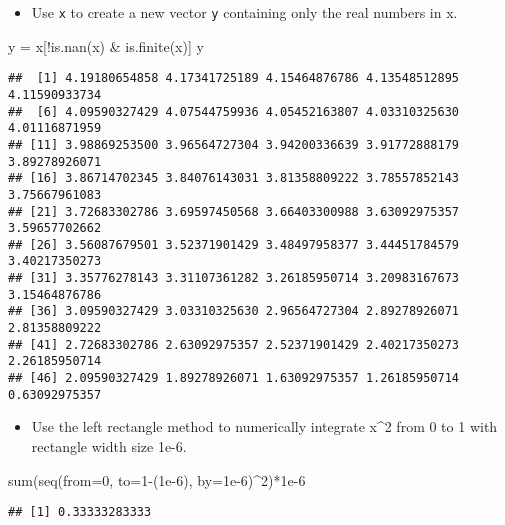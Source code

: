 \documentclass[
]{article}
\newenvironment{Shaded}{\begin{snugshade}}{\end{snugshade}}
\newcommand{\AttributeTok}[1]{\textcolor[rgb]{0.77,0.63,0.00}{#1}}
\newcommand{\DecValTok}[1]{\textcolor[rgb]{0.00,0.00,0.81}{#1}}
\newcommand{\FloatTok}[1]{\textcolor[rgb]{0.00,0.00,0.81}{#1}}
\newcommand{\FunctionTok}[1]{\textcolor[rgb]{0.00,0.00,0.00}{#1}}
\newcommand{\NormalTok}[1]{#1}
\newcommand{\OtherTok}[1]{\textcolor[rgb]{0.56,0.35,0.01}{#1}}
\newcommand{\SpecialCharTok}[1]{\textcolor[rgb]{0.00,0.00,0.00}{#1}}
\providecommand{\tightlist}{%
  \setlength{\itemsep}{0pt}\setlength{\parskip}{0pt}}
\begin{document}
\begin{itemize}
\tightlist
\item
  Use \texttt{x} to create a new vector \texttt{y} containing only the
  real numbers in x.
\end{itemize}

\begin{Shaded}
\begin{Highlighting}[]
\NormalTok{y }\OtherTok{=}\NormalTok{ x[}\SpecialCharTok{!}\FunctionTok{is.nan}\NormalTok{(x) }\SpecialCharTok{\&} \FunctionTok{is.finite}\NormalTok{(x)]}
\NormalTok{y}
\end{Highlighting}
\end{Shaded}

\begin{verbatim}
##  [1] 4.19180654858 4.17341725189 4.15464876786 4.13548512895 4.11590933734
##  [6] 4.09590327429 4.07544759936 4.05452163807 4.03310325630 4.01116871959
## [11] 3.98869253500 3.96564727304 3.94200336639 3.91772888179 3.89278926071
## [16] 3.86714702345 3.84076143031 3.81358809222 3.78557852143 3.75667961083
## [21] 3.72683302786 3.69597450568 3.66403300988 3.63092975357 3.59657702662
## [26] 3.56087679501 3.52371901429 3.48497958377 3.44451784579 3.40217350273
## [31] 3.35776278143 3.31107361282 3.26185950714 3.20983167673 3.15464876786
## [36] 3.09590327429 3.03310325630 2.96564727304 2.89278926071 2.81358809222
## [41] 2.72683302786 2.63092975357 2.52371901429 2.40217350273 2.26185950714
## [46] 2.09590327429 1.89278926071 1.63092975357 1.26185950714 0.63092975357
\end{verbatim}

\begin{itemize}
\tightlist
\item
  Use the left rectangle method to numerically integrate x\^{}2 from 0
  to 1 with rectangle width size 1e-6.
\end{itemize}

\begin{Shaded}
\begin{Highlighting}[]
\FunctionTok{sum}\NormalTok{(}\FunctionTok{seq}\NormalTok{(}\AttributeTok{from=}\DecValTok{0}\NormalTok{, }\AttributeTok{to=}\DecValTok{1}\SpecialCharTok{{-}}\NormalTok{(}\FloatTok{1e{-}6}\NormalTok{), }\AttributeTok{by=}\FloatTok{1e{-}6}\NormalTok{)}\SpecialCharTok{\^{}}\DecValTok{2}\NormalTok{)}\SpecialCharTok{*}\FloatTok{1e{-}6}
\end{Highlighting}
\end{Shaded}

\begin{verbatim}
## [1] 0.33333283333
\end{verbatim}
\end{document}
